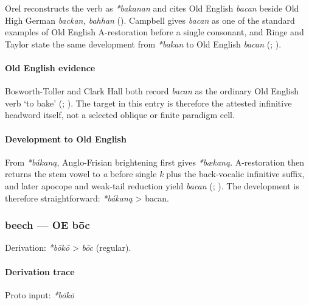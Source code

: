 \documentclass[
  british,
  a4paper,
]{article}
\begin{document}
Orel reconstructs the verb as \emph{*bakanan} and cites Old English
\emph{bacan} beside Old High German \emph{backan, bahhan}
(). Campbell gives \emph{bacan} as one
of the standard examples of Old English A-restoration before a single
consonant, and Ringe and Taylor state the same development from
\emph{*bakan} to Old English \emph{bacan}
(;
).

\paragraph{Old English evidence}\label{old-english-evidence}

Bosworth-Toller and Clark Hall both record \emph{bacan} as the ordinary
Old English verb `to bake' (; ).
The target in this entry is therefore the attested infinitive headword
itself, not a selected oblique or finite paradigm cell.

\paragraph{Development to Old English}\label{development-to-old-english}

From \emph{*bákaną}, Anglo-Frisian brightening first gives
\emph{*bækaną}. A-restoration then returns the stem vowel to \emph{a}
before single \emph{k} plus the back-vocalic infinitive suffix, and
later apocope and weak-tail reduction yield \emph{bacan}
(;
). The development
is therefore straightforward: \emph{*bákaną} \textgreater{} bacan.

\subsubsection{beech --- OE bōc}\label{beech-oe-bux14dc}

Derivation: \emph{*bōkō} \textgreater{} \emph{bōc} (regular).

\paragraph{Derivation trace}\label{derivation-trace-1}

Proto input: \emph{*bōkō}
\end{document}
